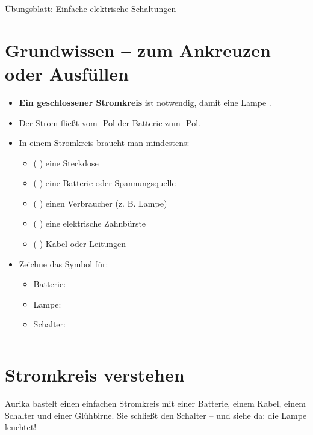\documentclass[a4paper,12pt]{article}
\begin{document}
	
Übungsblatt: Einfache elektrische Schaltungen 

	\section*{Grundwissen – zum Ankreuzen oder Ausfüllen}
	
	\begin{itemize}
		\item \textbf{Ein geschlossener Stromkreis} ist notwendig, damit eine Lampe \underline{\hspace{3cm}}.
		
		\item Der Strom fließt vom \underline{\hspace{2.5cm}}-Pol der Batterie zum \underline{\hspace{2.5cm}}-Pol.
		
		\item In einem Stromkreis braucht man mindestens:
		\begin{itemize}
			\item ( ) eine Steckdose
			\item ( ) eine Batterie oder Spannungsquelle
			\item ( ) einen Verbraucher (z. B. Lampe)
			\item ( ) eine elektrische Zahnbürste
			\item ( ) Kabel oder Leitungen
		\end{itemize}
		
		\item Zeichne das Symbol für:
		\begin{itemize}
			\item Batterie: \underline{\hspace{5cm}}
			\item Lampe: \underline{\hspace{5cm}}
			\item Schalter: \underline{\hspace{5cm}}
		\end{itemize}
	\end{itemize}
	
	\vspace{1em}
	\hrule
	\vspace{1em}
	
	\section*{ Stromkreis verstehen }
	
	Aurika bastelt einen einfachen Stromkreis mit einer Batterie, einem Kabel, einem Schalter und einer Glühbirne.  
	Sie schließt den Schalter – und siehe da: die Lampe leuchtet!
	
\end{document}

